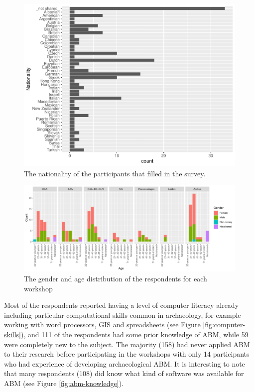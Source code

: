 \documentclass[
]{article}
\begin{document}
\begin{figure}
\centering
\includegraphics{paper_files/figure-latex/nationality-1.pdf}
\caption{\label{fig:nationality}The nationality of the participants that filled in the survey.}
\end{figure}

\begin{figure}
\centering
\includegraphics{paper_files/figure-latex/gender-age-1.pdf}
\caption{\label{fig:gender-age}The gender and age distribution of the respondents for each workshop}
\end{figure}

Most of the respondents reported having a level of computer literacy already including particular computational skills common in archaeology, for example working with word processors, GIS and spreadsheets (see Figure \ref{fig:computer-skills}), and 111 of the respondents had some prior knowledge of ABM, while 59 were completely new to the subject. The majority (158) had never applied ABM to their research before participating in the workshops with only 14 participants who had experience of developing archaeological ABM. It is interesting to note that many respondents (108) did know what kind of software was available for ABM (see Figure \ref{fig:abm-knowledge}).
\end{document}
